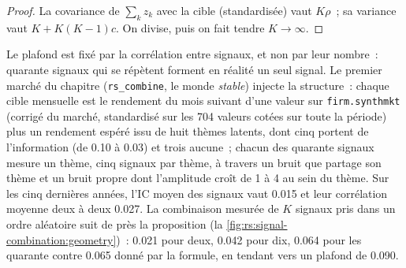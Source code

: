 \begin{proof}
La covariance de $\sum_k z_k$ avec la cible (standardisée) vaut $K\rho$~; sa variance vaut $K + K(K-1)c$. On divise, puis on fait tendre $K \to \infty$.
\end{proof}

Le plafond est fixé par la corrélation entre signaux, et non par leur nombre~: quarante signaux qui se répètent forment en réalité un seul signal. Le
premier marché du chapitre (\texttt{rs\_combine}, le monde \emph{stable}) injecte la structure~: chaque cible mensuelle est le rendement du mois suivant
d'une valeur sur \texttt{firm.synthmkt} (corrigé du marché, standardisé sur les 704 valeurs cotées sur toute la période) plus un rendement espéré issu de huit
thèmes latents, dont cinq portent de l'information (de 0.10 à 0.03) et trois aucune~; chacun des quarante signaux mesure un thème, cinq
signaux par thème, à travers un bruit que partage son thème et un bruit propre dont l'amplitude croît de 1 à 4 au sein du thème. Sur les cinq
dernières années, l'IC moyen des signaux vaut 0.015 et leur corrélation moyenne deux à deux 0.027. La combinaison mesurée de $K$ signaux pris dans un ordre aléatoire suit
de près la proposition (la \cref{fig:rs:signal-combination:geometry})~: 0.021 pour deux, 0.042 pour dix, 0.064 pour les quarante contre 0.065 donné
par la formule, en tendant vers un plafond de 0.090.

\begin{omfigure}

\label{fig:rs:signal-combination:geometry}
\end{omfigure}

